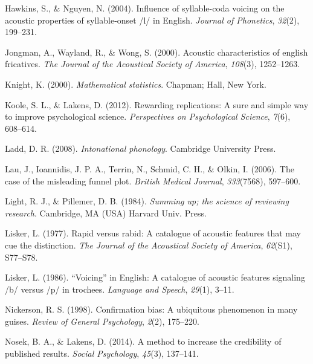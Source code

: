 \documentclass[
  english,
  man,floatsintext]{apa6}
\begin{document}
\leavevmode\hypertarget{ref-hawkins2004influence}{}%
Hawkins, S., \& Nguyen, N. (2004). Influence of syllable-coda voicing on the acoustic properties of syllable-onset /l/ in English. \emph{Journal of Phonetics}, \emph{32}(2), 199--231.

\leavevmode\hypertarget{ref-jongman2000acoustic}{}%
Jongman, A., Wayland, R., \& Wong, S. (2000). Acoustic characteristics of english fricatives. \emph{The Journal of the Acoustical Society of America}, \emph{108}(3), 1252--1263.

\leavevmode\hypertarget{ref-knight2000}{}%
Knight, K. (2000). \emph{Mathematical statistics}. Chapman; Hall, New York.

\leavevmode\hypertarget{ref-koole2012rewarding}{}%
Koole, S. L., \& Lakens, D. (2012). Rewarding replications: A sure and simple way to improve psychological science. \emph{Perspectives on Psychological Science}, \emph{7}(6), 608--614.

\leavevmode\hypertarget{ref-ladd2008intonational}{}%
Ladd, D. R. (2008). \emph{Intonational phonology}. Cambridge University Press.

\leavevmode\hypertarget{ref-lau2006}{}%
Lau, J., Ioannidis, J. P. A., Terrin, N., Schmid, C. H., \& Olkin, I. (2006). The case of the misleading funnel plot. \emph{British Medical Journal}, \emph{333}(7568), 597--600.

\leavevmode\hypertarget{ref-light1984}{}%
Light, R. J., \& Pillemer, D. B. (1984). \emph{Summing up; the science of reviewing research}. Cambridge, MA (USA) Harvard Univ. Press.

\leavevmode\hypertarget{ref-lisker1977rapid}{}%
Lisker, L. (1977). Rapid versus rabid: A catalogue of acoustic features that may cue the distinction. \emph{The Journal of the Acoustical Society of America}, \emph{62}(S1), S77--S78.

\leavevmode\hypertarget{ref-lisker1986voicing}{}%
Lisker, L. (1986). ``Voicing'' in English: A catalogue of acoustic features signaling /b/ versus /p/ in trochees. \emph{Language and Speech}, \emph{29}(1), 3--11.

\leavevmode\hypertarget{ref-nickerson1998confirmation}{}%
Nickerson, R. S. (1998). Confirmation bias: A ubiquitous phenomenon in many guises. \emph{Review of General Psychology}, \emph{2}(2), 175--220.

\leavevmode\hypertarget{ref-nosek2014method}{}%
Nosek, B. A., \& Lakens, D. (2014). A method to increase the credibility of published results. \emph{Social Psychology}, \emph{45}(3), 137--141.
\end{document}
